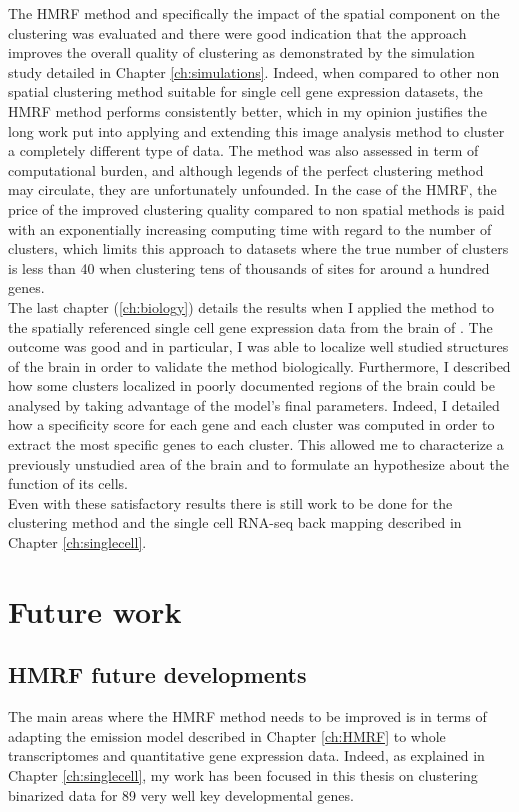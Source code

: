  The HMRF method and specifically the impact of the spatial component on the clustering was evaluated and there were good indication that the approach improves the overall quality of clustering as demonstrated by the simulation study detailed in Chapter \ref{ch:simulations}. Indeed, when compared to other non spatial clustering method suitable for single cell gene expression datasets, the HMRF method performs consistently better, which in my opinion justifies the long work put into applying and extending this image analysis method to cluster a completely different type of data. The method was also assessed in term of computational burden, and although legends of the perfect clustering method may circulate, they are unfortunately unfounded. In the case of the HMRF, the price of the improved clustering quality compared to non spatial methods is paid with an exponentially increasing computing time with regard to the number of clusters, which limits this approach to datasets where the true number of clusters is less than 40 when clustering tens of thousands of sites for around a hundred genes. \\
 
 The last chapter (\ref{ch:biology}) details the results when I applied the method to the spatially referenced single cell gene expression data from the brain of \platyfull{}. The outcome was good and in particular, I was able to localize well studied structures of the brain in order to validate the method biologically. Furthermore, I described how some clusters localized in poorly documented regions of the brain could be analysed by taking advantage of the model's final parameters. Indeed, I detailed how a specificity score for each gene and each cluster was computed in order to extract the most specific genes to each cluster. This allowed me to characterize a previously unstudied area of the brain and to formulate an hypothesize about the function of its cells. \\
 
  Even with these satisfactory results there is still work to be done for the clustering method and the single cell RNA-seq back mapping described in Chapter \ref{ch:singlecell}.\\
  
\section{Future work}
  
  \subsection{HMRF future developments}
  The main areas where the HMRF method needs to be improved is in terms of adapting the emission model described in Chapter \ref{ch:HMRF} to whole transcriptomes and quantitative gene expression data. Indeed, as explained in Chapter \ref{ch:singlecell}, my work has been focused in this thesis on clustering binarized data for 89 very well key developmental genes.\\
  
